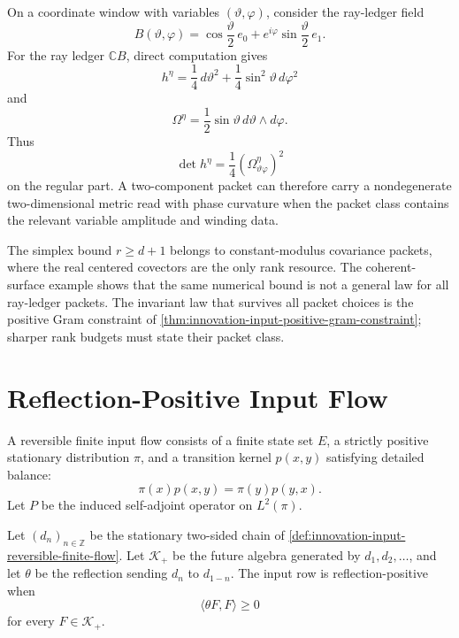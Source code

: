 \begin{example}
\label{ex:innovation-input-two-component-coherent-surface}
On a coordinate window with variables $(\vartheta,\varphi)$, consider the
ray-ledger field
$$
B(\vartheta,\varphi)
=
\cos\frac{\vartheta}{2}\,e_0
+
e^{i\varphi}\sin\frac{\vartheta}{2}\,e_1.
$$
For the ray ledger $\mathbb C B$, direct computation gives
$$
h^\eta
=
\frac14\,d\vartheta^2
+
\frac14\sin^2\vartheta\,d\varphi^2
$$
and
$$
\Omega^\eta
=
\frac12\sin\vartheta\,d\vartheta\wedge d\varphi.
$$
Thus
$$
\det h^\eta
=
\frac14(\Omega^\eta_{\vartheta\varphi})^2
$$
on the regular part. A two-component packet can therefore carry a
nondegenerate two-dimensional metric read with phase curvature when the
packet class contains the relevant variable amplitude and winding data.
\end{example}

\begin{principle}
\label{prin:innovation-input-rank-budgets-packet-relative}
The simplex bound $r\ge d+1$ belongs to constant-modulus covariance
packets, where the real centered covectors are the only rank resource.
The coherent-surface example shows that the same numerical bound is not a
general law for all ray-ledger packets. The invariant law that survives
all packet choices is the positive Gram constraint of
\autoref{thm:innovation-input-positive-gram-constraint}; sharper rank
budgets must state their packet class.
\end{principle}

\section{Reflection-Positive Input Flow}
\label{sec:innovation-input-reflection-positive-flow}

\begin{definition}
\label{def:innovation-input-reversible-finite-flow}
A reversible finite input flow consists of a finite state set $E$, a
strictly positive stationary distribution $\pi$, and a transition kernel
$p(x,y)$ satisfying detailed balance:
$$
\pi(x)p(x,y)=\pi(y)p(y,x).
$$
Let $P$ be the induced self-adjoint operator on $L^2(\pi)$.
\end{definition}

\begin{definition}
\label{def:innovation-input-reflection-positive-row}
Let $(d_n)_{n\in\mathbb Z}$ be the stationary two-sided chain of
\autoref{def:innovation-input-reversible-finite-flow}. Let
$\mathcal K_+$ be the future algebra generated by $d_1,d_2,\ldots$, and
let $\theta$ be the reflection sending $d_n$ to $d_{1-n}$. The input row is
reflection-positive when
$$
\langle \theta F,F\rangle\ge0
$$
for every $F\in\mathcal K_+$.
\end{definition}

